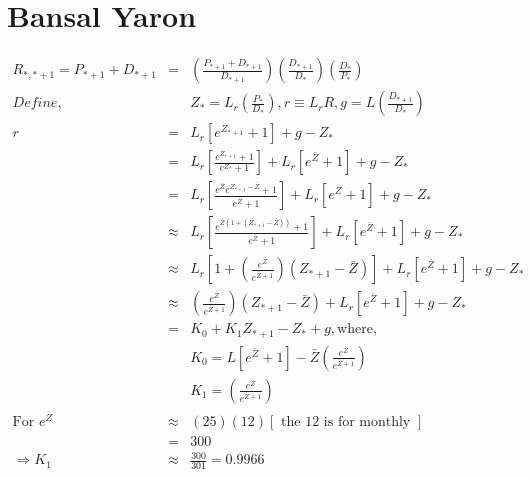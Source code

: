 \documentclass[]{article}
\begin{document}
\section*{Bansal Yaron}
\begin{eqnarray*}
R_{*,*+1} = P_{*+1} + D_{*+1} &=& \left( \frac{P_{*+1} + D_{*+1}}{D_{*+1}}\right) \left(\frac{D_{*+1}}{D_*}\right) \left(\frac{D_*}{P_*}\right)\\
Define,&& Z_* = L_r \left( \frac{P_*}{D_*} \right), r \equiv L_r R, g = L \left( \frac{D_{*+1}}{D_*} \right) \\
r &=& L_r \left[ e^{Z_{*+1}} +1 \right] + g - Z_*\\
&=& L_r \left[ \frac{e^{Z_{*+1}} +1}{e^{Z_{*}} +1} \right] + L_r \left[ e^{\bar{Z}} + 1 \right] + g - Z_*\\
&=& L_r \left[ \frac{e^{\bar{Z}}e^{Z_{*+1} - \bar{Z}} +1}{e^{\bar{Z}} +1} \right] + L_r \left[ e^{\bar{Z}} + 1 \right] + g - Z_*\\
&\approx & L_r \left[ \frac{e^{\bar{Z}\left(1+\left(Z_{*+1} - \bar{Z}\right) \right)} +1}{e^{\bar{Z}} +1} \right] + L_r \left[ e^{\bar{Z}} + 1 \right] + g - Z_*\\
&\approx & L_r \left[ 1 + \left( \frac{e^{\bar{Z}}}{e^{\bar{Z}+1}} \right) \left( Z_{*+1} - \bar{Z} \right) \right] + L_r \left[ e^{\bar{Z}} + 1 \right] + g - Z_*\\
&\approx & \left( \frac{e^{\bar{Z}}}{e^{\bar{Z}+1}} \right) \left( Z_{*+1} - \bar{Z} \right) + L_r \left[ e^{\bar{Z}} + 1 \right] + g - Z_*\\
&=& K_0 + K_1 Z_{*+1} - Z_* + g, \mbox{where,}\\
&& K_0 = L \left[ e^{\bar{Z}} + 1 \right] - \bar{Z} \left( \frac{e^{\bar{Z}}}{e^{\bar{Z}+1}} \right)\\
&& K_1 = \left( \frac{e^{\bar{Z}}}{e^{\bar{Z}+1}} \right)\\
\mbox{For } e^{\bar{Z}} &\approx & (25) (12) \left[ \mbox{ the 12 is for monthly } \right]\\
&=& 300\\
\Rightarrow K_1 &\approx & \frac{300}{301} = 0.9966\\
\end{eqnarray*}
\end{document}
